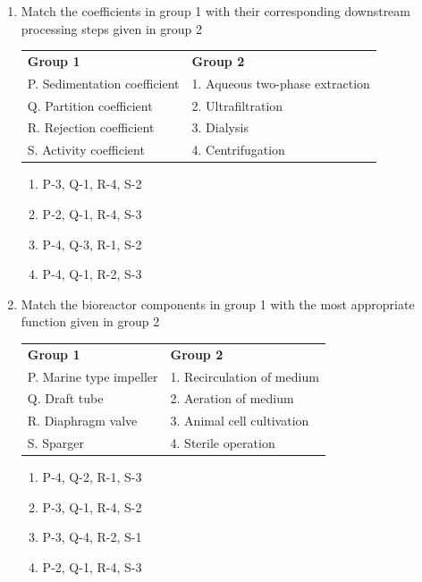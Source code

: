 \documentclass[journal,12pt,onecolumn]{IEEEtran}
\begin{document}
\begin{enumerate}
\item Match the coefficients in group 1 with their corresponding downstream processing steps given in group 2

\begin{center}
\begin{tabular}{ll}
\textbf{Group 1} & \textbf{Group 2} \\
P. Sedimentation coefficient & 1. Aqueous two-phase extraction \\
Q. Partition coefficient & 2. Ultrafiltration \\
R. Rejection coefficient & 3. Dialysis \\
S. Activity coefficient & 4. Centrifugation \\
\end{tabular}
\end{center}

\begin{multicols}{2}
\begin{enumerate}[label=(\Alph*)]
    \item P-3, Q-1, R-4, S-2
    \item P-2, Q-1, R-4, S-3
    \item P-4, Q-3, R-1, S-2
    \item P-4, Q-1, R-2, S-3
\end{enumerate}
\end{multicols}

\item Match the bioreactor components in group 1 with the most appropriate function given in group 2

\begin{center}
\begin{tabular}{ll}
\textbf{Group 1} & \textbf{Group 2} \\
P. Marine type impeller & 1. Recirculation of medium \\
Q. Draft tube & 2. Aeration of medium \\
R. Diaphragm valve & 3. Animal cell cultivation \\
S. Sparger & 4. Sterile operation \\
\end{tabular}
\end{center}

\begin{multicols}{2}
\begin{enumerate}[label=(\Alph*)]
    \item P-4, Q-2, R-1, S-3
    \item P-3, Q-1, R-4, S-2
    \item P-3, Q-4, R-2, S-1
    \item P-2, Q-1, R-4, S-3
\end{enumerate}
\end{multicols}


\end{enumerate}
\end{document}
